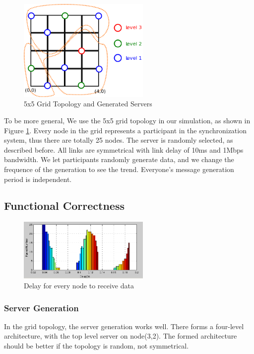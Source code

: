 \documentclass[conference]{IEEEtran}
\begin{document}
\begin{figure}[!t]
\centering
\includegraphics[width=2.5in]{../png/paper-topo.png}
\caption{5x5 Grid Topology and Generated Servers}
\label{paper_topo}
\end{figure}
To be more general, We use the 5x5 grid topology in our simulation,
as shown in Figure \ref{paper_topo}.
Every node in the grid represents a participant in the synchronization system,
thus there are totally 25 nodes. The server is randomly selected, as described before.
All links are symmetrical with link delay of 10ms and 1Mbps bandwidth.
We let participants randomly generate data,
and we change the frequence of the generation to see the trend.
Everyone's message generation period is independent.

\subsection{Functional Correctness}
\begin{figure}[!t]
\centering
\includegraphics[width=2.5in]{../png/function-delay.png}
\caption{Delay for every node to receive data}
\label{function_delay}
\end{figure}
\subsubsection{Server Generation}
In the grid topology, the server generation works well.
There forms a four-level architecture, with the top level server on node(3,2).
The formed architecture should be better if the topology is random, not symmetrical.
\end{document}
